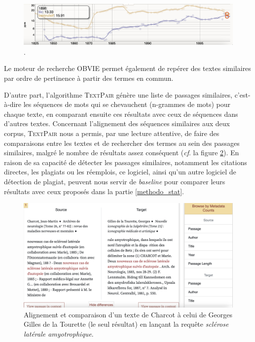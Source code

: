 \begin{figure}[h]
	\centering
	\includegraphics[width=1\textwidth]{img/tics_convulsifs.png}
	\caption{.
	}
	\label{fig:tics}
\end{figure}

Le moteur de recherche \textsc{OBVIE} permet également de repérer des textes similaires par ordre de pertinence à partir des termes en commun. 

D'autre part, l'algorithme \textsc{TextPair} génère une liste de passages similaires, c'est-à-dire les séquences de mots qui se chevauchent (n-grammes de mots) pour chaque texte, en comparant ensuite ces résultats avec ceux de séquences dans d'autres textes. Concernant l'alignement des séquences similaires aux deux corpus, \textsc{TextPair} nous a permis, par une lecture attentive, de faire des comparaisons entre les textes et de rechercher des termes au sein des passages similaires, malgré le nombre de résultats assez conséquent (\textit{cf}. la figure \ref{fig:textpair}). En raison de sa capacité de détecter les passages similaires, notamment les citations directes, les plagiats ou les réemplois, ce logiciel, ainsi qu'un autre logiciel de détection de plagiat, peuvent nous servir de \textit{baseline} pour comparer leurs résultats avec ceux proposés dans la partie \ref{methodo_stat}.

\begin{figure}[!ht]
    \centering
    \includegraphics[width=1\textwidth]{img/textpair.png}
    \caption{Alignement et comparaison d'un texte de Charcot à celui de Georges Gilles de la Tourette (le seul résultat) en lançant la requête \textit{sclérose latérale amyotrophique}.}
    \label{fig:textpair}
\end{figure}

